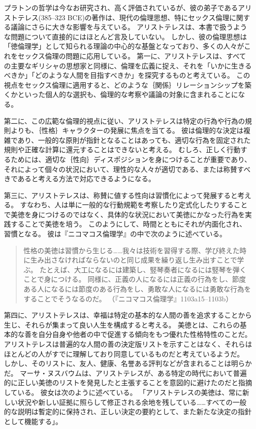 \documentclass[paper=a4,book,openany]{jlreq}
\begin{document}
プラトンの哲学は今なお研究され、高く評価されているが、彼の弟子であるアリストテレス(385--323 BCE)の著作は、現代の倫理思想、特にセックス倫理に関する議論にさらに大きな影響を与えている。
アリストテレスは、本書で扱うような問題について直接的にはほとんど言及していない。
しかし、彼の倫理思想は「徳倫理学」として知られる理論の中心的な基盤となっており、多くの人々がこれをセックス倫理の問題に応用している。
第一に、アリストテレスは、すべての主要なギリシャの思想家と同様に、倫理を広義に捉え、それを「いかに生きるべきか」「どのような人間を目指すべきか」を探究するものと考えている。
この視点をセックス倫理に適用すると、どのような｛関係｝{リレーションシップ}を築くかといった個人的な選択も、倫理的な考察や議論の対象に含まれることになる。

第二に、この広範な倫理的視点に従い、アリストテレスは特定の行為や行為の規則よりも、｛性格｝{キャラクター}の発展に焦点を当てる。
彼は倫理的な決定は複雑であり、一般的な原則が指針となることはあっても、適切な行為を固定された規則や正確な計算に還元することはできないと考える。
むしろ、正しく行動するためには、適切な｛性向｝{ディスポジション}を身につけることが重要であり、それによって個々の状況において、理性的な人々が適切である、または称賛すべきであると考える方法で対応できるようになる。

第三に、アリストテレスは、称賛に値する性向は習慣化によって発展すると考える。
すなわち、人は単に一般的な行動規範を考察したり定式化したりすることで美徳を身につけるのではなく、具体的な状況において美徳にかなった行為を実践することで美徳を培う。
このようにして、時間とともにそれが内面化され、習慣となる。
彼は『ニコマコス倫理学』の中で次のように述べている。

\begin{quote}
  性格の美徳は習慣から生じる……我々は技術を習得する際、学び終えた時に生み出さなければならないのと同じ成果を繰り返し生み出すことで学ぶ。
たとえば、大工になるには建築し、竪琴奏者になるには竪琴を弾くことで身につける。
同様に、正義の人になるには正義の行為をし、節度ある人になるには節度のある行為をし、勇敢な人になるには勇敢な行為をすることでそうなるのだ。
（『ニコマコス倫理学』1103a15--1103b）
\end{quote}

第四に、アリストテレスは、幸福は特定の基本的な人間の善を追求することから生じ、それらが集まって良い人生を構成すると考える。
美徳とは、これらの基本的な善を自分自身や他者の中で促進する傾向をもつ優れた性格特性のことだ。
アリストテレスは普遍的な人間の善の決定版リストを示すことはなく、それらはほとんどの人がすでに理解しており同意しているものだと考えているようだ。
しかし、そのリストに、友人、健康、名誉ある評判などが含まれることは明らかだ。
マーサ・ヌスバウムは、アリストテレスが、ある特定の時代において普遍的に正しい美徳のリストを発見したと主張することを意図的に避けたのだと指摘している。
彼女は次のように述べている。
「アリストテレスの美徳は、常に新しい状況や新しい証拠に照らして修正される余地を残している……すべての一般的な説明は暫定的に保持され、正しい決定の要約として、また新たな決定の指針として機能する」\citep[pp.259--260]{nussbaum93:_non_relat_virtues}。
\end{document}
